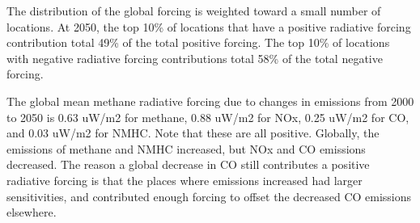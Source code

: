The distribution of the global forcing is weighted toward a small number of locations. At 2050, the top 10\% of locations that have a positive radiative forcing contribution total 49\% of the total positive forcing. The top 10\% of locations with negative radiative forcing contributions total 58\% of the total negative forcing.

The global mean methane radiative forcing due to changes in emissions from 2000 to 2050 is 0.63 uW/m2 for methane, 0.88 uW/m2 for NOx, 0.25 uW/m2 for CO, and 0.03 uW/m2 for NMHC. Note that these are all positive. Globally, the emissions of methane and NMHC increased, but NOx and CO emissions decreased. The reason a global decrease in CO still contributes a positive radiative forcing is that the places where emissions increased had larger sensitivities, and contributed enough forcing to offset the decreased CO emissions elsewhere.
